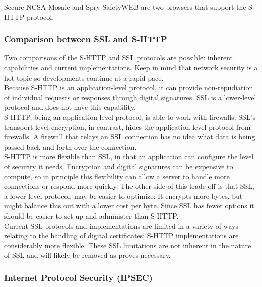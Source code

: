 Secure NCSA Mosaic and Spry SafetyWEB are two browsers that support the
S-HTTP protocol.


\subsubsection{Comparison between SSL and S-HTTP}
Two comparisons of the S-HTTP and SSL protocols are possible: inherent
capabilities and current implementations. Keep in mind that network
security is a hot topic so developments continue at a rapid pace.\\

Because S-HTTP is an application-level protocol, it can provide
non-repudiation of individual requests or responses through digital
signatures. SSL is a lower-level protocol and does not have this
capability.\\

S-HTTP, being an application-level protocol, is able to work with
firewalls. SSL's transport-level encryption, in contrast, hides the
application-level protocol from firewalls. A firewall that relays an
SSL connection has no idea what data is being passed back and forth
over the connection.\\

S-HTTP is more flexible than SSL, in that an application can configure
the level of security it needs. Encryption and digital signatures can
be expensive to compute, so in principle this flexibility can allow a
server to handle more connections or respond more quickly. The other
side of this trade-off is that SSL, a lower-level protocol, may be
easier to optimize: It encrypts more bytes, but might balance this out
with a lower cost per byte. Since SSL has fewer options it should be
easier to set up and administer than S-HTTP.\\

Current SSL protocols and implementations are limited in a variety of
ways relating to the handling of digital certificates; S-HTTP
implementations are considerably more flexible. These SSL limitations
are not inherent in the nature of SSL and will likely be removed as
proves necessary.

\subsubsection{Internet Protocol Security (IPSEC)}

